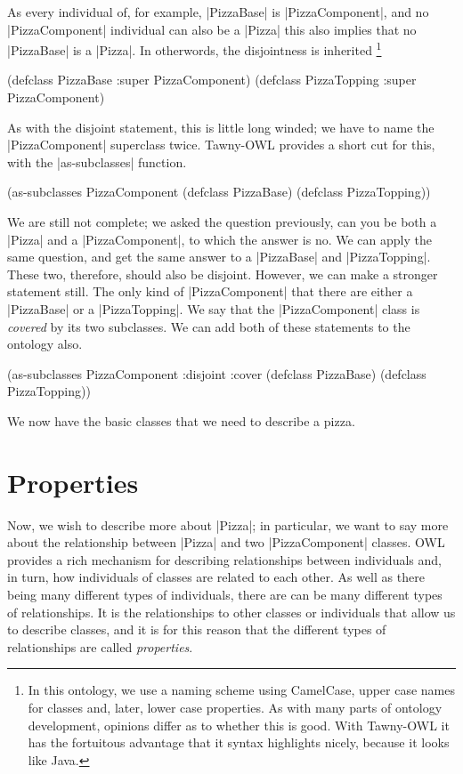 As every individual of, for example, |PizzaBase| is |PizzaComponent|, and no
|PizzaComponent| individual can also be a |Pizza| this also implies that no
|PizzaBase| is a |Pizza|. In otherwords, the disjointness is inherited
\footnote{In this ontology, we use a naming scheme using CamelCase, upper case
  names for classes and, later, lower case properties. As with many parts of
  ontology development, opinions differ as to whether this is good. With
  Tawny-OWL it has the fortuitous advantage that it syntax highlights nicely,
  because it looks like Java.}

\begin{tawny}
(defclass PizzaBase
  :super PizzaComponent)
(defclass PizzaTopping
  :super PizzaComponent)
\end{tawny}


As with the disjoint statement, this is little long winded; we have to name
the |PizzaComponent| superclass twice. Tawny-OWL provides a short cut for
this, with the |as-subclasses| function.

\begin{tawny}
(as-subclasses
 PizzaComponent
 (defclass PizzaBase)
 (defclass PizzaTopping))
\end{tawny}

We are still not complete; we asked the question previously, can you be both a
|Pizza| and a |PizzaComponent|, to which the answer is no. We can apply the
same question, and get the same answer to a |PizzaBase| and |PizzaTopping|.
These two, therefore, should also be disjoint. However, we can make a stronger
statement still. The only kind of |PizzaComponent| that there are either a
|PizzaBase| or a |PizzaTopping|. We say that the |PizzaComponent| class is
\emph{covered} by its two subclasses. We can add both of these statements to the
ontology also.

\begin{tawny}
(as-subclasses
 PizzaComponent
 :disjoint :cover
 (defclass PizzaBase)
 (defclass PizzaTopping))
\end{tawny}

We now have the basic classes that we need to describe a pizza.


\section{Properties}
\label{sec:properties}

Now, we wish to describe more about |Pizza|; in particular, we want to say
more about the relationship between |Pizza| and two |PizzaComponent| classes.
OWL provides a rich mechanism for describing relationships between individuals
and, in turn, how individuals of classes are related to each other. As well as
there being many different types of individuals, there are can be many
different types of relationships. It is the relationships to other classes or
individuals that allow us to describe classes, and it is for this reason that
the different types of relationships are called \emph{properties}.

